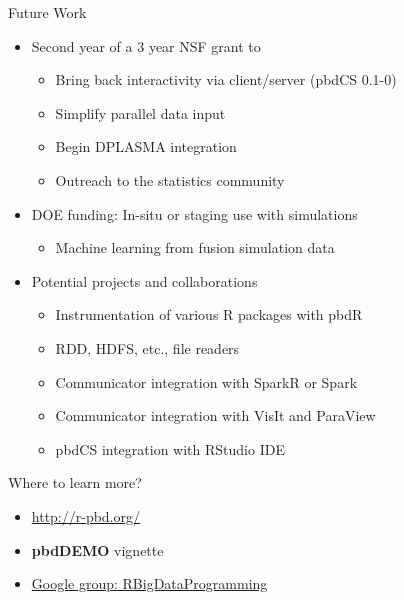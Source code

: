 \begin{frame}
  \begin{block}{Future Work}
  \begin{itemize}
    \item Second year of a 3 year NSF grant to
      \begin{itemize}
      \item Bring back interactivity via client/server (pbdCS 0.1-0)
      \item Simplify parallel data input
      \item Begin DPLASMA integration
      \item Outreach to the statistics community
      \end{itemize}
    \item DOE funding: In-situ or staging use with simulations
      \begin{itemize}
      \item Machine learning from fusion simulation data
      \end{itemize}
    \item Potential projects and collaborations
      \begin{itemize}
      \item Instrumentation of various R packages with pbdR
      \item RDD, HDFS, etc., file readers
      \item Communicator integration with SparkR or Spark
      \item Communicator integration with VisIt and ParaView
      \item pbdCS integration with RStudio IDE
      \end{itemize}
  \end{itemize}
  \end{block}
\end{frame}

\begin{frame}
  \begin{block}{Where to learn more?}
  \begin{itemize}
    \item \url{http://r-pbd.org/}
    \item \textbf{pbdDEMO} vignette
    \item \url{Google group: RBigDataProgramming}
  \end{itemize}
  \end{block}
\end{frame}

